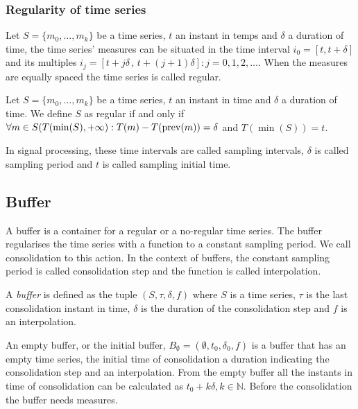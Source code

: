 \subsubsection{Regularity of time series} 

Let $S=\{m_0,\ldots,m_k\}$ be a time series, $t$ an instant in temps
and $\delta$ a duration of time, the time series' measures can be
situated in the time interval $i_0=[t,t+\delta]$ and its multiples
$i_j=[t+j\delta \,,\, t+(j+1)\delta]: j=0,1,2,\ldots$. When the
measures are equally spaced the time series is called regular.

\begin{definition}
  Let $S=\{m_0,\ldots,m_k\}$ be a time series, $t$ an instant in time
  and $\delta$ a duration of time. We define $S$ as regular if and
  only if $\forall m \in S(T(\min(S),+\infty):T(m) - T(\operatorname*{prev}(m)) =
  \delta$ and $T(\min(S))=t$.
\end{definition}

In signal processing, these time intervals are called sampling
intervals, $\delta$ is called sampling period and $t$ is called
sampling initial time.  


\subsection{Buffer}\label{sec:model:buffer}

A buffer is a container for a regular or a no-regular time series. The
buffer regularises the time series with a function to a constant
sampling period. We call consolidation to this action. In the context
of buffers, the constant sampling period is called consolidation step
and the function is called interpolation.

\begin{definition}[Buffer]
  A \emph{buffer} is defined as the tuple $(S,\tau,\delta,f)$ where
  $S$ is a time series, $\tau$ is the last consolidation instant in
  time, $\delta$ is the duration of the consolidation step and $f$ is
  an interpolation.
\end{definition}

An empty buffer, or the initial buffer, $B_{\emptyset} =
(\emptyset,t_0, \delta_0, f)$ is a buffer that has an empty time
series, the initial time of consolidation a duration indicating the
consolidation step and an interpolation. From the empty buffer all the
instants in time of consolidation can be calculated as $t_0+k\delta,
k\in\mathbb{N}$. Before the consolidation the buffer needs measures.


